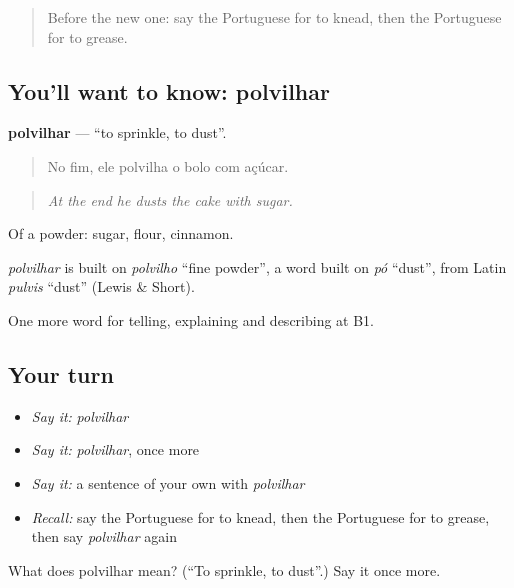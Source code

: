 \label{lesson:PT-C333-polvilhar}



\begin{quote}
Before the new one: say the Portuguese for to knead, then the Portuguese for to grease.
\end{quote}

\subsection*{You'll want to know: polvilhar}
\textbf{polvilhar} — \textquotedblleft{}to sprinkle, to dust\textquotedblright{}.

\begin{quote}
No fim, ele polvilha o bolo com açúcar.
\end{quote}

\begin{quote}
\emph{At the end he dusts the cake with sugar.}
\end{quote}

Of a powder: sugar, flour, cinnamon.

\begin{cousinweb}
\emph{polvilhar} is built on \emph{polvilho} \textquotedblleft{}fine powder\textquotedblright{}, a word built on \emph{pó} \textquotedblleft{}dust\textquotedblright{}, from Latin \emph{pulvis} \textquotedblleft{}dust\textquotedblright{} (Lewis \& Short).
\end{cousinweb}

\begin{grammarlens}[title={What you've built}]
One more word for telling, explaining and describing at B1.
\end{grammarlens}

\subsection*{Your turn}
\begin{itemize}
\raggedright
  \item \emph{Say it:} \emph{polvilhar}
  \item \emph{Say it:} \emph{polvilhar}, once more
  \item \emph{Say it:} a sentence of your own with \emph{polvilhar}
  \item \emph{Recall:} say the Portuguese for to knead, then the Portuguese for to grease, then say \emph{polvilhar} again
\end{itemize}

\begin{tcolorbox}[breakable,colback=teal!4,colframe=teal!35!black,title={Before you move on}]
What does polvilhar mean? (\textquotedblleft{}To sprinkle, to dust\textquotedblright{}.) Say it once more.
\end{tcolorbox}
